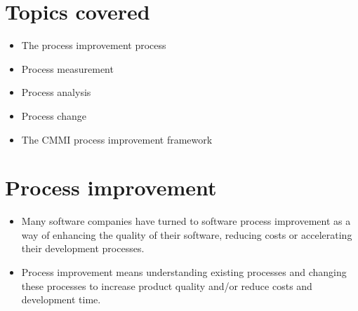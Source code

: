 \section{Topics covered}
\begin{itemize}
\item The process improvement process
\item Process measurement
\item Process analysis
\item Process change
\item The CMMI process improvement framework
\end{itemize}



\section{Process improvement}
\begin{itemize}
\item Many software companies have turned to software process improvement as a way of enhancing the quality of their software, reducing costs or accelerating their development processes.
\item Process improvement means understanding existing processes and changing these processes to increase product quality and/or reduce costs and development time.
\end{itemize}



